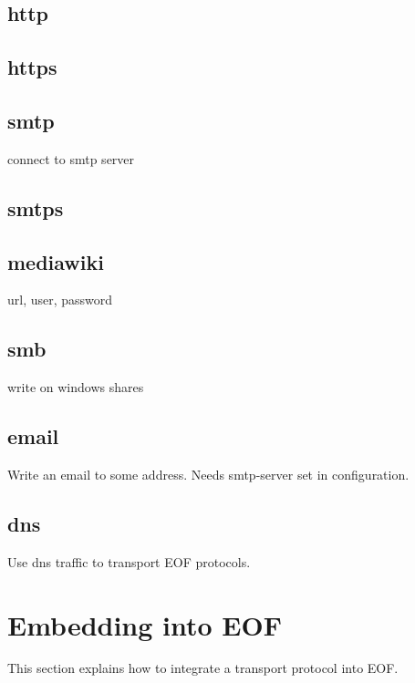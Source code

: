 \documentclass[12pt,a4paper]{book}
\begin{document}
\subsection{http}
\subsection{https}
\subsection{smtp}
connect to smtp server
\subsection{smtps}
\subsection{mediawiki}
url, user, password
\subsection{smb}
write on windows shares
\subsection{email}
Write an email to some address. Needs smtp-server set in configuration.
\subsection{dns}
Use dns traffic to transport EOF protocols.

\section{Embedding into EOF}
This section explains how to integrate a transport protocol into EOF.
\end{document}
